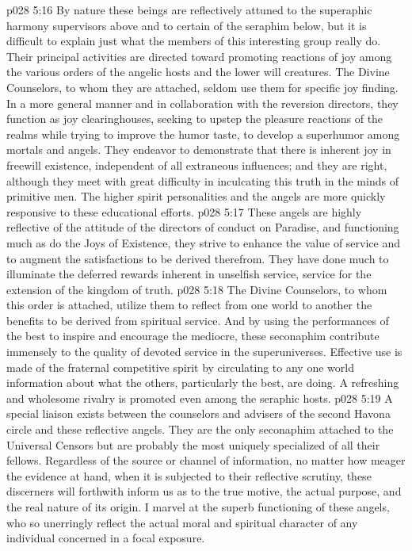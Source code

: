 \pc \vs p028 5:16 \bibnobreakspace {} By nature these beings are reflectively attuned to the superaphic harmony supervisors above and to certain of the seraphim below, but it is difficult to explain just what the members of this interesting group really do. Their principal activities are directed toward promoting reactions of joy among the various orders of the angelic hosts and the lower will creatures. The Divine Counselors, to whom they are attached, seldom use them for specific joy finding. In a more general manner and in collaboration with the reversion directors, they function as joy clearinghouses, seeking to upstep the pleasure reactions of the realms while trying to improve the humor taste, to develop a superhumor among mortals and angels. They endeavor to demonstrate that there is inherent joy in freewill existence, independent of all extraneous influences; and they are right, although they meet with great difficulty in inculcating this truth in the minds of primitive men. The higher spirit personalities and the angels are more quickly responsive to these educational efforts.
\pc \vs p028 5:17 \bibnobreakspace {} These angels are highly reflective of the attitude of the directors of conduct on Paradise, and functioning much as do the Joys of Existence, they strive to enhance the value of service and to augment the satisfactions to be derived therefrom. They have done much to illuminate the deferred rewards inherent in unselfish service, service for the extension of the kingdom of truth.
\vs p028 5:18 The Divine Counselors, to whom this order is attached, utilize them to reflect from one world to another the benefits to be derived from spiritual service. And by using the performances of the best to inspire and encourage the mediocre, these seconaphim contribute immensely to the quality of devoted service in the superuniverses. Effective use is made of the fraternal competitive spirit by circulating to any one world information about what the others, particularly the best, are doing. A refreshing and wholesome rivalry is promoted even among the seraphic hosts.
\pc \vs p028 5:19 \bibnobreakspace {} A special liaison exists between the counselors and advisers of the second Havona circle and these reflective angels. They are the only seconaphim attached to the Universal Censors but are probably the most uniquely specialized of all their fellows. Regardless of the source or channel of information, no matter how meager the evidence at hand, when it is subjected to their reflective scrutiny, these discerners will forthwith inform us as to the true motive, the actual purpose, and the real nature of its origin. I marvel at the superb functioning of these angels, who so unerringly reflect the actual moral and spiritual character of any individual concerned in a focal exposure.

